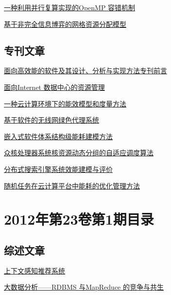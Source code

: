 \documentclass[a4paper]{article}
\begin{document}
\href{http://www.jos.org.cn/ch/reader/download_pdf.aspx?file_no=3919&year_id=2012&quarter_id=2&falg=1}{一种利用并行复算实现的OpenMP 容错机制}

\href{http://www.jos.org.cn/ch/reader/download_pdf.aspx?file_no=3972&year_id=2012&quarter_id=2&falg=1}{基于非完全信息博弈的网格资源分配模型}

\subsection{专刊文章}
\href{http://www.jos.org.cn/ch/reader/download_pdf.aspx?file_no=4147&year_id=2012&quarter_id=2&falg=1}{面向高效能的软件及其设计、分析与实现方法专刊前言}

\href{http://www.jos.org.cn/ch/reader/download_pdf.aspx?file_no=4146&year_id=2012&quarter_id=2&falg=1}{面向Internet 数据中心的资源管理}

\href{http://www.jos.org.cn/ch/reader/download_pdf.aspx?file_no=4144&year_id=2012&quarter_id=2&falg=1}{一种云计算环境下的能效模型和度量方法}

\href{http://www.jos.org.cn/ch/reader/download_pdf.aspx?file_no=4142&year_id=2012&quarter_id=2&falg=1}{基于软件的无线网绿色代理系统}

\href{http://www.jos.org.cn/ch/reader/download_pdf.aspx?file_no=4145&year_id=2012&quarter_id=2&falg=1}{嵌入式软件体系结构级能耗建模方法}

\href{http://www.jos.org.cn/ch/reader/download_pdf.aspx?file_no=4141&year_id=2012&quarter_id=2&falg=1}{众核处理器系统核资源动态分组的自适应调度算法}

\href{http://www.jos.org.cn/ch/reader/download_pdf.aspx?file_no=4140&year_id=2012&quarter_id=2&falg=1}{分布式搜索引擎系统效能建模与评价}

\href{http://www.jos.org.cn/ch/reader/download_pdf.aspx?file_no=4143&year_id=2012&quarter_id=2&falg=1}{随机任务在云计算平台中能耗的优化管理方法}


\section{\textbf{2012年第23卷第1期目录}}
\subsection{综述文章}
\href{http://www.jos.org.cn/ch/reader/download_pdf.aspx?file_no=4100&year_id=2012&quarter_id=1&falg=1}{上下文感知推荐系统}

\href{http://www.jos.org.cn/ch/reader/download_pdf.aspx?file_no=4091&year_id=2012&quarter_id=1&falg=1}{大数据分析——RDBMS 与MapReduce 的竞争与共生}
\end{document}
